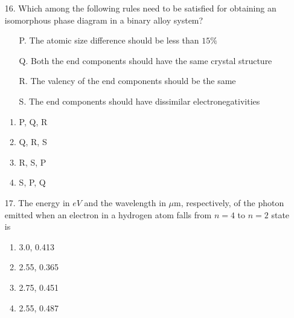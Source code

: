 \documentclass[journal,12pt,onecolumn]{IEEEtran}
\theoremstyle{remark}
\begin{document}
\begin{enumerate}
\begin{multicols}{2}
        \end{multicols}

        \hfill{}
        \begin{enumerate}
        \end{enumerate}

    \item[16.] Which among the following rules need to be satisfied for obtaining an isomorphous phase diagram
in a binary alloy system? 
            \begin{enumerate}
                \item[P.] The atomic size difference should be less than $15\%$ 
                \item[Q.] Both the end components should have the same crystal structure
                \item[R.] The valency of the end components should be the same
                \item[S.] The end components should have dissimilar electronegativities
            \end{enumerate}
        \hfill{}
        \begin{multicols}{4}
            \begin{enumerate}
                \item  P, Q, R \columnbreak
                \item  Q, R, S \columnbreak
                \item  R, S, P  \columnbreak
                \item  S, P, Q
            \end{enumerate}
        \end{multicols}


    \item[17.] The energy in $eV$ and the wavelength in $\mu$m, respectively, of the photon emitted when an electron
in a hydrogen atom falls from $n = 4$ to $n = 2$ state is
        \hfill{}
        \begin{multicols}{4}
            \begin{enumerate}
                \item  3.0, 0.413 \columnbreak
                \item  2.55, 0.365 \columnbreak
                \item  2.75, 0.451  \columnbreak
                \item  2.55, 0.487
            \end{enumerate}
        \end{multicols}


\end{enumerate}
\end{document}
